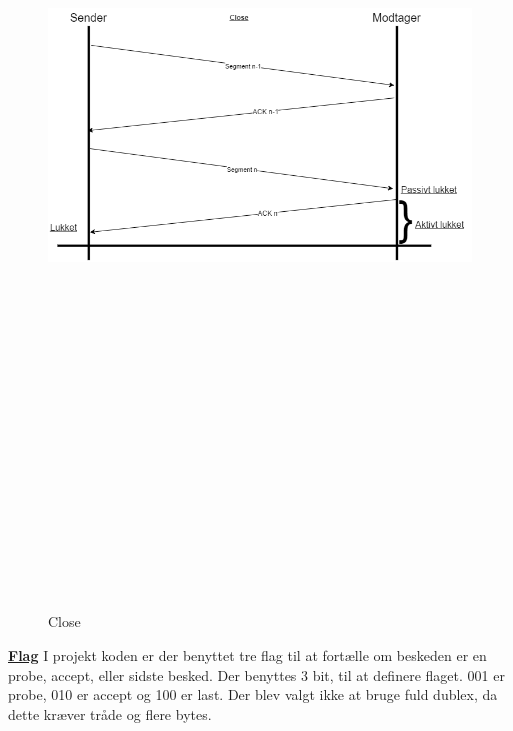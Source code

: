 \begin{figure}[ht]
	\centering
	\includegraphics[width=15cm,height=25cm,keepaspectratio]{pictures/Close.png}
	\caption{Close}
	\label{fig:close}
\end{figure}

\hfill \break
\hfill \break
\hfill \break
\hfill \break
\underline{\textbf{Flag}}
\newline
I projekt koden er der benyttet tre flag til at fortælle om beskeden er en probe, accept, eller sidste besked.
Der benyttes 3 bit, til at definere flaget. 001 er probe, 010 er accept og 100 er last.
\hfill \break
\newline
Der blev valgt ikke at bruge fuld dublex, da dette kræver tråde og flere bytes.